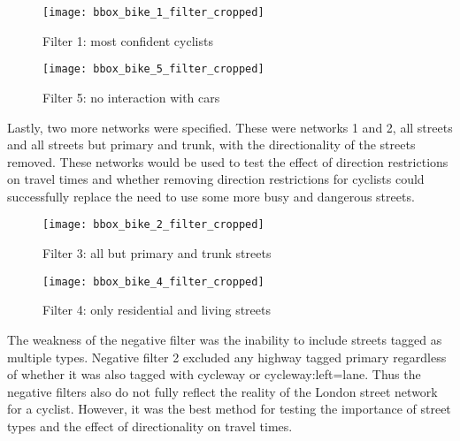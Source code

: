 \begin{figure}
  \centering
  \texttt{[image: bbox\_bike\_1\_filter\_cropped]}
  \caption{Filter 1: most confident cyclists}
  \label{fig:sub1}
\end{figure}

\begin{figure}
  \centering
  \texttt{[image: bbox\_bike\_5\_filter\_cropped]}
  \caption{Filter 5: no interaction with cars }
  \label{fig:sub2}
\end{figure}

Lastly, two more networks were specified. These were networks 1 and 2, all streets and all streets but primary and trunk, with the directionality of the streets removed. These networks would be used to test the effect of direction restrictions on travel times and whether removing direction restrictions for cyclists could successfully replace the need to use some more busy and dangerous streets. 

\begin{figure}
  \centering
  \texttt{[image: bbox\_bike\_2\_filter\_cropped]}
  \caption{Filter 3: all but primary and trunk streets}
  \label{fig:sub3}
\end{figure}



\begin{figure}
  \centering
  \texttt{[image: bbox\_bike\_4\_filter\_cropped]}
  \caption{Filter 4: only residential and living streets}
  \label{fig:sub4}
\end{figure}

The weakness of the negative filter was the inability to include streets tagged as multiple types. Negative filter 2 excluded any highway tagged primary regardless of whether it was also tagged with cycleway or cycleway:left=lane. Thus the negative filters also do not fully reflect the reality of the London street network for a cyclist. However, it was the best method for testing the importance of street types and the effect of directionality on travel times. 

%

